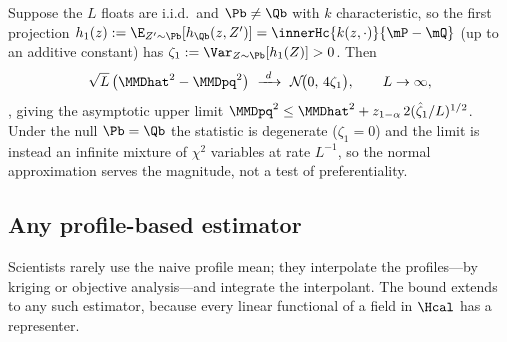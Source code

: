 \begin{theorem}
\label{thm:kb-clt}
Suppose the $L$ floats are i.i.d.\ and $\Pb\ne\Qb$ with $k$ characteristic, so the
first projection $h_1(z):=\E_{Z'\sim\Pb}[h_{\Qb}(z,Z')]=\innerHc{k(z,\cdot)}{\mP-\mQ}$
(up to an additive constant) has $\zeta_1:=\Var_{Z\sim\Pb}[h_1(Z)]>0$. Then
\[
  \sqrt{L}\,\big(\MMDhat^2-\MMDpq^2\big)\ \xrightarrow{\ d\ }\ \mathcal N\!\big(0,\,4\zeta_1\big),
  \qquad L\to\infty,
\]
\citep[Theorem~3.6]{muandet2017,gretton2012,serfling1980}, giving the asymptotic
upper limit $\MMDpq^2\le\MMDhat^2+z_{1-\alpha}\,2(\hat\zeta_1/L)^{1/2}$. Under the
null $\Pb=\Qb$ the statistic is degenerate ($\zeta_1=0$) and the limit is instead an
infinite mixture of $\chi^2$ variables at rate $L^{-1}$, so the normal
approximation serves the magnitude, not a test of preferentiality.
\end{theorem}

\subsection{Any profile-based estimator}
\label{sec:kb-estimators}

Scientists rarely use the naive profile mean; they interpolate the profiles---by
kriging or objective analysis---and integrate the interpolant. The bound extends to
any such estimator, because every linear functional of a field in $\Hcal$ has a
representer.

